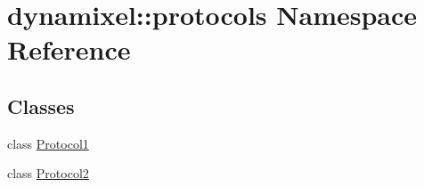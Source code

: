 \hypertarget{namespacedynamixel_1_1protocols}{}\section{dynamixel\+:\+:protocols Namespace Reference}
\label{namespacedynamixel_1_1protocols}
\subsection*{Classes}
\begin{DoxyCompactItemize}
\item 
class \hyperlink{classdynamixel_1_1protocols_1_1_protocol1}{Protocol1}
\item 
class \hyperlink{classdynamixel_1_1protocols_1_1_protocol2}{Protocol2}
\end{DoxyCompactItemize}
